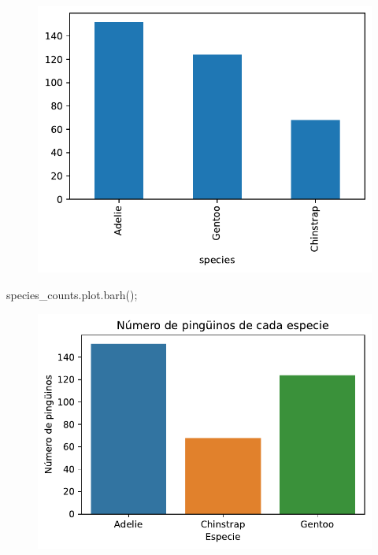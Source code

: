 \documentclass[
  a4paper,
  noprof,
  12pt,
  notoc,
  nosols,
  nobib]{mnye}
\newenvironment{Shaded}{\begin{snugshade}}{\end{snugshade}}
\newcommand{\NormalTok}[1]{\textcolor[rgb]{0.00,0.23,0.31}{#1}}
\newcommand{\OperatorTok}[1]{\textcolor[rgb]{0.37,0.37,0.37}{#1}}
\theoremstyle{definition}
\theoremstyle{remark}
\begin{document}
\begin{figure}[tbph]

{\centering \includegraphics{chapters/1categorical_files/figure-pdf/cell-10-output-1.pdf}

}

\end{figure}

\begin{Shaded}
\begin{Highlighting}[]
\NormalTok{species\_counts.plot.barh()}\OperatorTok{;}
\end{Highlighting}
\end{Shaded}

\begin{figure}[tbph]

{\centering \includegraphics{chapters/1categorical_files/figure-pdf/cell-11-output-1.pdf}

}

\end{figure}
\end{document}
